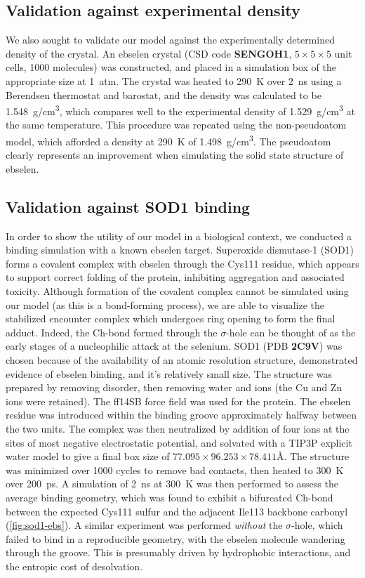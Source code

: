 \begin{refsection}
\subsection{Validation against experimental density}
We also sought to validate our model against the experimentally determined density of the crystal.
An ebselen crystal (CSD code \textbf{SENGOH1}, $5 \times 5 \times 5$ unit cells, 1000 molecules) was constructed, and placed in a simulation box of the appropriate size at 1~atm.
The crystal was heated to 290~K over 2~ns using a Berendsen thermostat and barostat, and the density was calculated to be 1.548~g/cm\textsuperscript{3}, which compares well to the experimental density of 1.529~g/cm\textsuperscript{3} at the same temperature.\autocite{Dupont1990StructuresII}
This procedure was repeated using the non-pseudoatom model, which afforded a density at 290~K of 1.498~g/cm\textsuperscript{3}.
The pseudoatom clearly represents an improvement when simulating the solid state structure of ebselen.

\subsection{Validation against SOD1 binding}
In order to show the utility of our model in a biological context, we conducted a binding simulation with a known ebselen target.
Superoxide dismutase-1 (SOD1) forms a covalent complex with ebselen through the Cys111 residue, which appears to support correct folding of the protein, inhibiting aggregation and associated toxicity.\autocite{Capper2018}
Although formation of the covalent complex cannot be simulated using our model (as this is a bond-forming process), we are able to visualize the stabilized encounter complex which undergoes ring opening to form the final adduct.
Indeed, the Ch-bond formed through the $\sigma$-hole can be thought of as the early stages of a nucleophilic attack at the selenium.\autocite{Thomas2015}
SOD1 (PDB \textbf{2C9V}) was chosen because of the availability of an atomic resolution structure, demonstrated evidence of ebselen binding, and it's relatively small size.\autocite{Capper2018,Strange2006}
The structure was prepared by removing disorder, then removing water and ions (the Cu and Zn ions were retained).
The ff14SB force field was used for the protein.
The ebselen residue was introduced within the binding groove approximately halfway between the two units.
The complex was then neutralized by addition of four  ions at the sites of most negative electrostatic potential, and solvated with a TIP3P explicit water model to give a final box size of $77.095\times 96.253\times 78.411$\AA.
The structure was minimized over 1000 cycles to remove bad contacts, then heated to 300~K over 200~ps.
A simulation of 2~ns at 300~K was then performed to assess the average binding geometry, which was found to exhibit a bifurcated Ch-bond between the expected Cys111 sulfur and the adjacent Ile113 backbone carbonyl (\cref{fig:sod1-ebs}).
A similar experiment was performed \emph{without} the $\sigma$-hole, which failed to bind in a reproducible geometry, with the ebselen molecule wandering through the groove.
This is presumably driven by hydrophobic interactions, and the entropic cost of desolvation.


\end{refsection}
